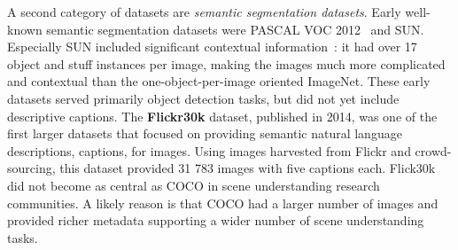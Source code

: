 \documentclass[english,twoside,openright]{HYgraduMLDS}
\begin{document}
A second category of datasets are \textit{semantic segmentation datasets}. Early well-known semantic segmentation datasets were PASCAL VOC 2012~\cite{pascal-voc-2012} and SUN. Especially SUN included significant contextual information~\cite{Coco}: it had over 17 object and stuff instances per image, making the images much more complicated and contextual than the one-object-per-image oriented ImageNet. These early datasets served primarily object detection tasks, but did not yet include descriptive captions. The \textbf{Flickr30k} dataset, published in 2014, was one of the first larger datasets that focused on providing semantic natural language descriptions, captions, for images. Using images harvested from Flickr and crowd-sourcing, this dataset provided 31 783 images with five captions each. Flick30k did not become as central as COCO in scene understanding research communities. A likely reason is that COCO had a larger number of images and provided richer metadata supporting a wider number of scene understanding tasks.
\end{document}
